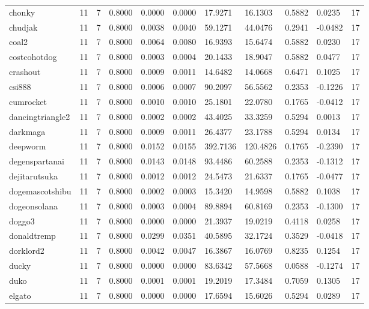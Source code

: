 \begin{table}[htbp]
\begin{tabular}{lllllllllll}
chonky & 11 & 7 & 0.8000 & 0.0000 & 0.0000 & 17.9271 & 16.1303 & 0.5882 & 0.0235 & 17 \\
chudjak & 11 & 7 & 0.8000 & 0.0038 & 0.0040 & 59.1271 & 44.0476 & 0.2941 & -0.0482 & 17 \\
coal2 & 11 & 7 & 0.8000 & 0.0064 & 0.0080 & 16.9393 & 15.6474 & 0.5882 & 0.0230 & 17 \\
costcohotdog & 11 & 7 & 0.8000 & 0.0003 & 0.0004 & 20.1433 & 18.9047 & 0.5882 & 0.0477 & 17 \\
crashout & 11 & 7 & 0.8000 & 0.0009 & 0.0011 & 14.6482 & 14.0668 & 0.6471 & 0.1025 & 17 \\
csi888 & 11 & 7 & 0.8000 & 0.0006 & 0.0007 & 90.2097 & 56.5562 & 0.2353 & -0.1226 & 17 \\
cumrocket & 11 & 7 & 0.8000 & 0.0010 & 0.0010 & 25.1801 & 22.0780 & 0.1765 & -0.0412 & 17 \\
dancingtriangle2 & 11 & 7 & 0.8000 & 0.0002 & 0.0002 & 43.4025 & 33.3259 & 0.5294 & 0.0013 & 17 \\
darkmaga & 11 & 7 & 0.8000 & 0.0009 & 0.0011 & 26.4377 & 23.1788 & 0.5294 & 0.0134 & 17 \\
deepworm & 11 & 7 & 0.8000 & 0.0152 & 0.0155 & 392.7136 & 120.4826 & 0.1765 & -0.2390 & 17 \\
degenspartanai & 11 & 7 & 0.8000 & 0.0143 & 0.0148 & 93.4486 & 60.2588 & 0.2353 & -0.1312 & 17 \\
dejitarutsuka & 11 & 7 & 0.8000 & 0.0012 & 0.0012 & 24.5473 & 21.6337 & 0.1765 & -0.0477 & 17 \\
dogemascotshibu & 11 & 7 & 0.8000 & 0.0002 & 0.0003 & 15.3420 & 14.9598 & 0.5882 & 0.1038 & 17 \\
dogeonsolana & 11 & 7 & 0.8000 & 0.0003 & 0.0004 & 89.8894 & 60.8169 & 0.2353 & -0.1300 & 17 \\
doggo3 & 11 & 7 & 0.8000 & 0.0000 & 0.0000 & 21.3937 & 19.0219 & 0.4118 & 0.0258 & 17 \\
donaldtremp & 11 & 7 & 0.8000 & 0.0299 & 0.0351 & 40.5895 & 32.1724 & 0.3529 & -0.0418 & 17 \\
dorklord2 & 11 & 7 & 0.8000 & 0.0042 & 0.0047 & 16.3867 & 16.0769 & 0.8235 & 0.1254 & 17 \\
ducky & 11 & 7 & 0.8000 & 0.0000 & 0.0000 & 83.6342 & 57.5668 & 0.0588 & -0.1274 & 17 \\
duko & 11 & 7 & 0.8000 & 0.0001 & 0.0001 & 19.2019 & 17.3484 & 0.7059 & 0.1305 & 17 \\
elgato & 11 & 7 & 0.8000 & 0.0000 & 0.0000 & 17.6594 & 15.6026 & 0.5294 & 0.0289 & 17 \\

\end{tabular}
\end{table}
